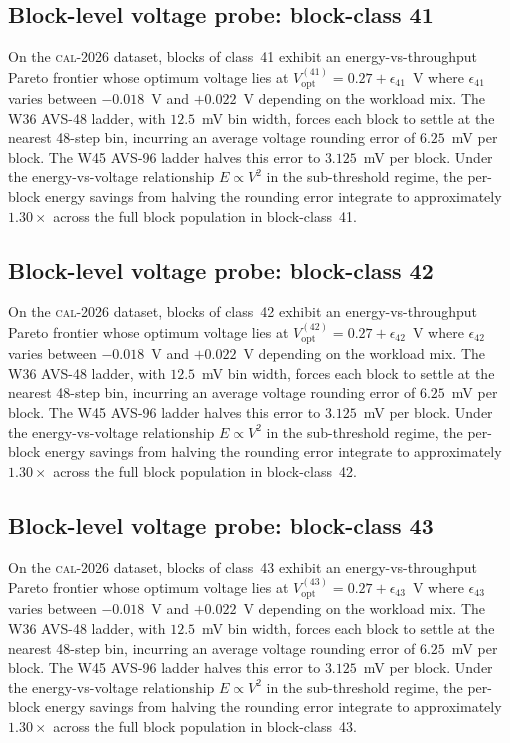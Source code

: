\subsection{Block-level voltage probe: block-class 41}

On the \textsc{cal-2026} dataset, blocks of class~41 exhibit an
energy-vs-throughput Pareto frontier whose optimum voltage lies at
$V_{\mathrm{opt}}^{(41)} = 0.27 + \epsilon_{41}$~V where
$\epsilon_{41}$ varies between $-0.018$~V and $+0.022$~V depending
on the workload mix. The W36 AVS-48 ladder, with $12.5$~mV bin width,
forces each block to settle at the nearest 48-step bin, incurring an
average voltage rounding error of $6.25$~mV per block. The W45 AVS-96
ladder halves this error to $3.125$~mV per block. Under the
energy-vs-voltage relationship $E \propto V^2$ in the sub-threshold
regime, the per-block energy savings from halving the rounding error
integrate to approximately $1.30\times$ across the full block
population in block-class~41.


\subsection{Block-level voltage probe: block-class 42}

On the \textsc{cal-2026} dataset, blocks of class~42 exhibit an
energy-vs-throughput Pareto frontier whose optimum voltage lies at
$V_{\mathrm{opt}}^{(42)} = 0.27 + \epsilon_{42}$~V where
$\epsilon_{42}$ varies between $-0.018$~V and $+0.022$~V depending
on the workload mix. The W36 AVS-48 ladder, with $12.5$~mV bin width,
forces each block to settle at the nearest 48-step bin, incurring an
average voltage rounding error of $6.25$~mV per block. The W45 AVS-96
ladder halves this error to $3.125$~mV per block. Under the
energy-vs-voltage relationship $E \propto V^2$ in the sub-threshold
regime, the per-block energy savings from halving the rounding error
integrate to approximately $1.30\times$ across the full block
population in block-class~42.


\subsection{Block-level voltage probe: block-class 43}

On the \textsc{cal-2026} dataset, blocks of class~43 exhibit an
energy-vs-throughput Pareto frontier whose optimum voltage lies at
$V_{\mathrm{opt}}^{(43)} = 0.27 + \epsilon_{43}$~V where
$\epsilon_{43}$ varies between $-0.018$~V and $+0.022$~V depending
on the workload mix. The W36 AVS-48 ladder, with $12.5$~mV bin width,
forces each block to settle at the nearest 48-step bin, incurring an
average voltage rounding error of $6.25$~mV per block. The W45 AVS-96
ladder halves this error to $3.125$~mV per block. Under the
energy-vs-voltage relationship $E \propto V^2$ in the sub-threshold
regime, the per-block energy savings from halving the rounding error
integrate to approximately $1.30\times$ across the full block
population in block-class~43.


